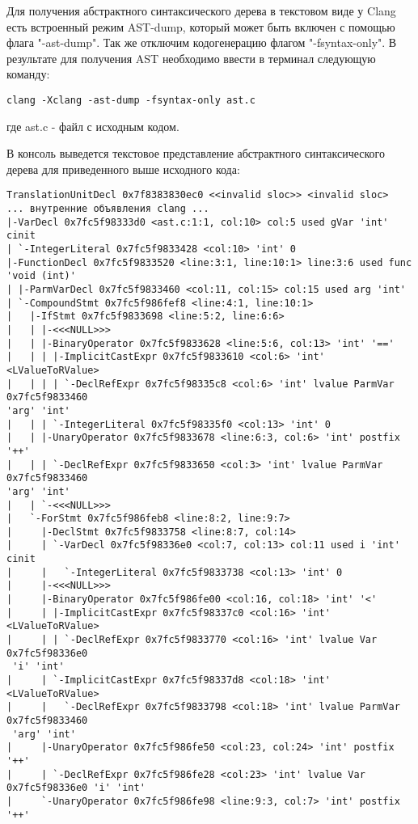Для получения абстрактного синтаксического дерева в текстовом виде у Clang есть встроенный 
режим AST-dump, который может быть включен с помощью флага "-ast-dump". Так же отключим кодогенерацию
флагом "-fsyntax-only". В результате для получения AST необходимо ввести в терминал следующую команду:
\begin{lstlisting}
clang -Xclang -ast-dump -fsyntax-only ast.c
\end{lstlisting}
где ast.c - файл с исходным кодом.

В консоль выведется текстовое представление абстрактного синтаксического дерева для приведенного выше исходного кода:
\begin{lstlisting}[basicstyle=\tiny]
TranslationUnitDecl 0x7f8383830ec0 <<invalid sloc>> <invalid sloc>
... внутренние объявления clang ...
|-VarDecl 0x7fc5f98333d0 <ast.c:1:1, col:10> col:5 used gVar 'int' cinit
| `-IntegerLiteral 0x7fc5f9833428 <col:10> 'int' 0
|-FunctionDecl 0x7fc5f9833520 <line:3:1, line:10:1> line:3:6 used func 'void (int)'
| |-ParmVarDecl 0x7fc5f9833460 <col:11, col:15> col:15 used arg 'int'
| `-CompoundStmt 0x7fc5f986fef8 <line:4:1, line:10:1>
|   |-IfStmt 0x7fc5f9833698 <line:5:2, line:6:6>
|   | |-<<<NULL>>>
|   | |-BinaryOperator 0x7fc5f9833628 <line:5:6, col:13> 'int' '=='
|   | | |-ImplicitCastExpr 0x7fc5f9833610 <col:6> 'int' <LValueToRValue>
|   | | | `-DeclRefExpr 0x7fc5f98335c8 <col:6> 'int' lvalue ParmVar 0x7fc5f9833460
'arg' 'int'
|   | | `-IntegerLiteral 0x7fc5f98335f0 <col:13> 'int' 0
|   | |-UnaryOperator 0x7fc5f9833678 <line:6:3, col:6> 'int' postfix '++'
|   | | `-DeclRefExpr 0x7fc5f9833650 <col:3> 'int' lvalue ParmVar 0x7fc5f9833460
'arg' 'int'
|   | `-<<<NULL>>>
|   `-ForStmt 0x7fc5f986feb8 <line:8:2, line:9:7>
|     |-DeclStmt 0x7fc5f9833758 <line:8:7, col:14>
|     | `-VarDecl 0x7fc5f98336e0 <col:7, col:13> col:11 used i 'int' cinit
|     |   `-IntegerLiteral 0x7fc5f9833738 <col:13> 'int' 0
|     |-<<<NULL>>>
|     |-BinaryOperator 0x7fc5f986fe00 <col:16, col:18> 'int' '<'
|     | |-ImplicitCastExpr 0x7fc5f98337c0 <col:16> 'int' <LValueToRValue>
|     | | `-DeclRefExpr 0x7fc5f9833770 <col:16> 'int' lvalue Var 0x7fc5f98336e0
 'i' 'int'
|     | `-ImplicitCastExpr 0x7fc5f98337d8 <col:18> 'int' <LValueToRValue>
|     |   `-DeclRefExpr 0x7fc5f9833798 <col:18> 'int' lvalue ParmVar 0x7fc5f9833460
 'arg' 'int'
|     |-UnaryOperator 0x7fc5f986fe50 <col:23, col:24> 'int' postfix '++'
|     | `-DeclRefExpr 0x7fc5f986fe28 <col:23> 'int' lvalue Var 0x7fc5f98336e0 'i' 'int'
|     `-UnaryOperator 0x7fc5f986fe98 <line:9:3, col:7> 'int' postfix '++'

\end{lstlisting}
